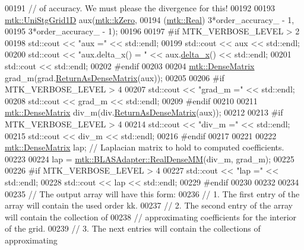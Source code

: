 \begin{DoxyCode}
00191   \textcolor{comment}{// of accuracy. We must please the divergence for this!}
00192 
00193   \hyperlink{classmtk_1_1UniStgGrid1D}{mtk::UniStgGrid1D} aux(\hyperlink{group__c01-roots_ga59a451a5fae30d59649bcda274fea271}{mtk::kZero},
00194                         (\hyperlink{group__c01-roots_gac080bbbf5cbb5502c9f00405f894857d}{mtk::Real}) 3*order\_accuracy\_ - 1,
00195                         3*order\_accuracy\_ - 1);
00196 
00197 \textcolor{preprocessor}{  #if MTK\_VERBOSE\_LEVEL > 2}
00198   std::cout << \textcolor{stringliteral}{"aux ="} << std::endl;
00199   std::cout << aux << std::endl;
00200   std::cout << \textcolor{stringliteral}{"aux.delta\_x() = "} << aux.\hyperlink{classmtk_1_1UniStgGrid1D_a6e7173b01241632cf509496d66b9f74c}{delta\_x}() << std::endl;
00201   std::cout << std::endl;
00202 \textcolor{preprocessor}{  #endif}
00203 
00204   \hyperlink{classmtk_1_1DenseMatrix}{mtk::DenseMatrix} grad\_m(grad.\hyperlink{classmtk_1_1Grad1D_a77b2eddbe4ab03f469306c604d505b1a}{ReturnAsDenseMatrix}(aux));
00205 
00206 \textcolor{preprocessor}{  #if MTK\_VERBOSE\_LEVEL > 4}
00207   std::cout << \textcolor{stringliteral}{"grad\_m ="} << std::endl;
00208   std::cout << grad\_m << std::endl;
00209 \textcolor{preprocessor}{  #endif}
00210 
00211   \hyperlink{classmtk_1_1DenseMatrix}{mtk::DenseMatrix} div\_m(div.\hyperlink{classmtk_1_1Div1D_a213fddbaaf86e4840c6a9649b69c2d49}{ReturnAsDenseMatrix}(aux));
00212 
00213 \textcolor{preprocessor}{  #if MTK\_VERBOSE\_LEVEL > 4}
00214   std::cout << \textcolor{stringliteral}{"div\_m ="} << std::endl;
00215   std::cout << div\_m << std::endl;
00216 \textcolor{preprocessor}{  #endif}
00217 
00221 
00222   \hyperlink{classmtk_1_1DenseMatrix}{mtk::DenseMatrix} lap; \textcolor{comment}{// Laplacian matrix to hold to computed coefficients.}
00223 
00224   lap = \hyperlink{classmtk_1_1BLASAdapter_acebd0e9bfe0bdd609c7fbea98ccfd3b5}{mtk::BLASAdapter::RealDenseMM}(div\_m, grad\_m);
00225 
00226 \textcolor{preprocessor}{  #if MTK\_VERBOSE\_LEVEL > 4}
00227   std::cout << \textcolor{stringliteral}{"lap ="} << std::endl;
00228   std::cout << lap << std::endl;
00229 \textcolor{preprocessor}{  #endif}
00230 
00232 
00234 
00235   \textcolor{comment}{// The output array will have this form:}
00236   \textcolor{comment}{// 1. The first entry of the array will contain the used order kk.}
00237   \textcolor{comment}{// 2. The second entry of the array will contain the collection of}
00238   \textcolor{comment}{// approximating coefficients for the interior of the grid.}
00239   \textcolor{comment}{// 3. The next entries will contain the collections of approximating}

\end{DoxyCode}

